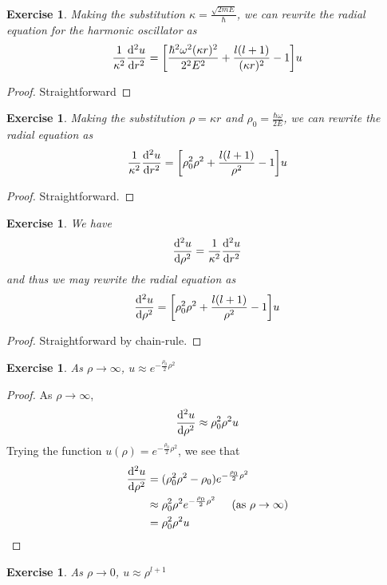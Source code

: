 \documentclass[12pt]{amsart}
\newtheorem{ex}[thm]{Exercise}
\newcommand{\om}{\omega}
\newcommand{\kap}{\kappa}
\begin{document}
\begin{ex}
Making the substitution $\kappa = \frac{\sqrt{2mE}}{\hbar}$, we can rewrite the radial equation for the harmonic oscillator as $$\frac{1}{\kap^2}\dv[2]{u}{r} = \bigg[ \frac{\hbar^2 \om^2 (\kap r)^2}{2^2E^2} + \frac{l(l+1)}{(\kap r)^2} - 1\bigg]u$$
\end{ex}

\begin{proof}
Straightforward
\end{proof}

\begin{ex}
Making the substitution $\rho = \kap r$ and $\rho_0 = \frac{\hbar \om}{2 E}$, we can rewrite the radial equation as $$\frac{1}{\kap^2}\dv[2]{u}{r} = \bigg[ \rho_0^2 \rho^2 + \frac{l(l+1)}{\rho^2} - 1\bigg]u$$
\end{ex}

\begin{proof}
Straightforward.
\end{proof}

\begin{ex}
We have $$\dv[2]{u}{\rho} = \frac{1}{\kap^2}\dv[2]{u}{r}$$ and thus we may rewrite the radial equation as $$\dv[2]{u}{\rho} = \bigg[ \rho_0^2 \rho^2 + \frac{l(l+1)}{\rho^2} - 1\bigg]u$$
\end{ex}

\begin{proof}
Straightforward by chain-rule.
\end{proof}

\begin{ex}
As $ \rho \rightarrow \infty$, $u \approx e^{-\frac{\rho_0}{2}\rho^2}$
\end{ex}

\begin{proof}
As $\rho \rightarrow \infty$, $$\dv[2]{u}{\rho} \approx \rho_0^2 \rho^2u$$ Trying the function $u(\rho) = e^{-\frac{\rho_0}{2}\rho^2}$, we see that
\begin{align*}
\dv[2]{u}{\rho} 
&= (\rho_0^2 \rho^2 - \rho_0)e^{-\frac{\rho_0}{2}\rho^2}\\
& \approx \rho_0^2 \rho^2 e^{-\frac{\rho_0}{2}\rho^2} \hspace{.5cm} \text{(as }  \rho  \rightarrow \infty \text{)}\\
&=  \rho_0^2 \rho^2 u
\end{align*}
\end{proof}

\begin{ex}
As $\rho \rightarrow 0$, $u \approx \rho^{l+1}$
\end{ex}
\end{document}
